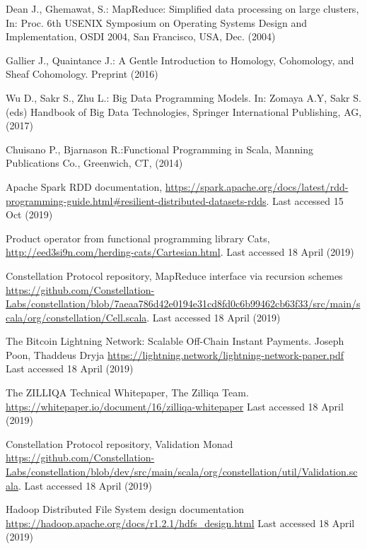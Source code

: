 \documentclass[runningheads]{llncs}
\begin{document}
\begin{thebibliography}{8}
Dean J., Ghemawat, S.: MapReduce: Simplified data processing on large clusters, In: Proc. 6th USENIX Symposium on Operating Systems Design and Implementation, OSDI 2004, San Francisco, USA, Dec. (2004)

Gallier J., Quaintance J.: A Gentle Introduction to Homology, Cohomology, and Sheaf Cohomology. Preprint (2016)

Wu D., Sakr S., Zhu L.: Big Data Programming Models. In: Zomaya A.Y, Sakr S. (eds) Handbook of Big Data Technologies, Springer International Publishing, AG, (2017) 

Chuisano P., Bjarnason R.:Functional Programming in Scala, Manning Publications Co., Greenwich, CT, (2014)

Apache Spark RDD documentation, \url{https://spark.apache.org/docs/latest/rdd-programming-guide.html\#resilient-distributed-datasets-rdds}. Last accessed 15 Oct (2019)

Product operator from functional programming library Cats, \url{http://eed3si9n.com/herding-cats/Cartesian.html}. Last accessed 18 April (2019)

Constellation Protocol repository, MapReduce interface via recursion schemes \url{https://github.com/Constellation-Labs/constellation/blob/7aeaa786d42e0194e31cd8fd0c6b99462cb63f33/src/main/scala/org/constellation/Cell.scala}. Last accessed 18 April (2019)

The Bitcoin Lightning Network: Scalable Off-Chain Instant Payments. Joseph Poon, Thaddeus Dryja \url{https://lightning.network/lightning-network-paper.pdf} Last accessed 18 April (2019)

The ZILLIQA Technical Whitepaper, The Zilliqa Team. \url{https://whitepaper.io/document/16/zilliqa-whitepaper} Last accessed 18 April (2019)

Constellation Protocol repository, Validation Monad \url{https://github.com/Constellation-Labs/constellation/blob/dev/src/main/scala/org/constellation/util/Validation.scala}. Last accessed 18 April (2019)

Hadoop Distributed File System design documentation \url{https://hadoop.apache.org/docs/r1.2.1/hdfs\_design.html} Last accessed 18 April (2019) 

\end{thebibliography}
\end{document}
